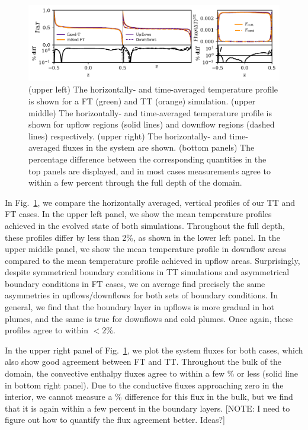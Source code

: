\documentclass[aps, pre, onecolumn, nofootinbib, notitlepage, groupedaddress, amsfonts, amssymb, amsmath, longbibliography, superscriptaddress]{revtex4-1}
\begin{document}
\begin{figure}
\includegraphics[width=\textwidth]{./figs/rbc_1D_profiles.pdf}
\caption{ 
	(upper left) The horizontally- and time-averaged temperature profile is shown for a FT (green) and TT (orange) simulation.
	(upper middle) The horizontally- and time-averaged temperature profile is shown for upflow regions (solid lines) and downflow regions (dashed lines) respectively.
	(upper right) The horizontally- and time-averaged fluxes in the system are shown.
	(bottom panels) The percentage difference between the corresponding quantities in the top panels are displayed, and in most cases measurements agree to within a few percent through the full depth of the domain.
\label{fig:rbc_1D_profiles} }
\end{figure}

In Fig.~\ref{fig:rbc_1D_profiles}, we compare the horizontally averaged, vertical profiles of our TT and FT cases.
In the upper left panel, we show the mean temperature profiles achieved in the evolved state of both simulations.
Throughout the full depth, these profiles differ by less than 2\%, as shown in the lower left panel.
In the upper middle panel, we show the mean temperature profile in downflow areas compared to the mean temperature profile achieved in upflow areas.
Surprisingly, despite symmetrical boundary conditions in TT simulations and asymmetrical boundary conditions in FT cases, we on average find precisely the same asymmetries in upflows/downflows for both sets of boundary conditions.
In general, we find that the boundary layer in upflows is more gradual in hot plumes, and the same is true for downflows and cold plumes.
Once again, these profiles agree to within $< 2\%$.

In the upper right panel of Fig.~\ref{fig:rbc_1D_profiles}, we plot the system fluxes for both cases, which also show good agreement between FT and TT.
Throughout the bulk of the domain, the convective enthalpy fluxes agree to within a few \% or less (solid line in bottom right panel).
Due to the conductive fluxes approaching zero in the interior, we cannot measure a \% difference for this flux in the bulk, but we find that it is again within a few percent in the boundary layers.
[NOTE: I need to figure out how to quantify the flux agreement better. Ideas?]
\end{document}
